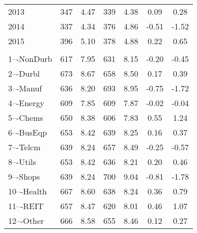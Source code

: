 \begin{tabular}{lcccccc}
    2013 & 347  &   4.47  &    339  &   4.38  &   0.09  &      0.28 \\
    2014 & 337  &   4.34  &    376  &   4.86  &  -0.51  &     -1.52 \\
    2015 & 396  &   5.10  &    378  &   4.88  &   0.22  &      0.65 \\
     \addlinespace \multicolumn{7}{l}{\textbf{Industry (FF 12)}} \\
     1–-NonDurb     &    617   &    7.95   &     631   &    8.15   &   -0.20   &    -0.45   \\
     2–-Durbl       &    673   &    8.67   &     658   &    8.50   &    0.17   &     0.39   \\
     3–-Manuf       &    636   &    8.20   &     693   &    8.95   &   -0.75   &    -1.72   \\
     4–-Energy      &    609   &    7.85   &     609   &    7.87   &   -0.02   &    -0.04   \\
     5–-Chems       &    650   &    8.38   &     606   &    7.83   &    0.55   &     1.24   \\
     6–-BusEqp      &    653   &    8.42   &     639   &    8.25   &    0.16   &     0.37   \\
     7–-Telcm       &    639   &    8.24   &     657   &    8.49   &   -0.25   &    -0.57   \\
     8–-Utils       &    653   &    8.42   &     636   &    8.21   &    0.20   &     0.46   \\
     9–-Shops       &    639   &    8.24   &     700   &    9.04   &   -0.81   &    -1.78   \\
    10–-Health      &    667   &    8.60   &     638   &    8.24   &    0.36   &     0.79   \\
    11–-REIT        &    657   &    8.47   &     620   &    8.01   &    0.46   &     1.07   \\
    12–-Other       &    666   &    8.58   &     655   &    8.46   &    0.12   &     0.27   \\
    \bottomrule
    \end{tabular}
